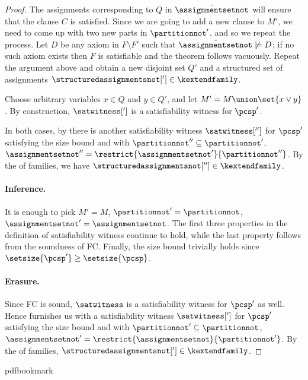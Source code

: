\documentclass[11pt]{article}
\numberwithin{equation}{section}
\theoremstyle{definition}
\theoremstyle{plain}
\begin{document}
\begin{proof}
The assignments corresponding to $Q$ in $\tilde{\assignmentsetnot}$ will ensure that the clause $C$ is satisfied. Since we are going to add a new clause to $M'$, we need to come up with two new parts in $\partitionnot'$, and so we repeat the process. Let $D$ be any axiom in $F\setminus F'$ such that $\tilde{\assignmentsetnot}\not\models D$; if no such axiom exists then $F$ is satisfiable and the theorem follows vacuously. Repeat the argument above and obtain a new disjoint set $Q'$ and a structured set of assignments $\structuredassignmentsnot['] \in \kextendfamily$.

Choose arbitrary variables $x \in Q$ and $y \in Q'$, and let $M'=M\union\set{x\lor y}$. By construction, $\satwitness[']$ is a satisfiability witness for $\pcsp'$.

In both cases, by  there is another satisfiability witness $\satwitness['']$ for $\pcsp'$ satisfying the size bound and with $\partitionnot''\subseteq\partitionnot'$, $\assignmentsetnot''=\restrict{\assignmentsetnot'}{\partitionnot''}$. By the \restrictionproperty of \kextendibleNok families, we have $\structuredassignmentsnot[''] \in \kextendfamily$.

%
\paragraph{Inference.} It is enough to pick $M'=M$, $\partitionnot'=\partitionnot$, $\assignmentsetnot'=\assignmentsetnot$. The first three properties in the definition of satisfiability witness continue to hold, while the last property follows from the soundness of FC\@. Finally, the size bound trivially holds since $\setsize{\pcsp'} \geq \setsize{\pcsp}$.

%
\paragraph{Erasure.} Since FC is sound, $\satwitness$ is a satisfiability witness for $\pcsp'$ as well. Hence  furnishes us with a satisfiability witness $\satwitness[']$ for $\pcsp'$ satisfying the size bound and with $\partitionnot'\subseteq\partitionnot$, $\assignmentsetnot'=\restrict{\assignmentsetnot}{\partitionnot'}$. By the \restrictionproperty of \kextendibleNok families, $\structuredassignmentsnot['] \in \kextendfamily$.
\end{proof}


\newcommand{\prelim}{Preliminary version in\ }\newcommand{\prelims}{Preliminary
  versions in\ }
\providecommand{\bibhead}[1]{}
\expandafter\ifx\csname pdfbookmark\endcsname\relax%
  \providecommand{\tocrefpdfbookmark}{}
\else\providecommand{\tocrefpdfbookmark}{%
   \hypertarget{tocreferences}{}%
   \pdfbookmark[1]{References}{tocreferences}}%
\fi
\end{document}
